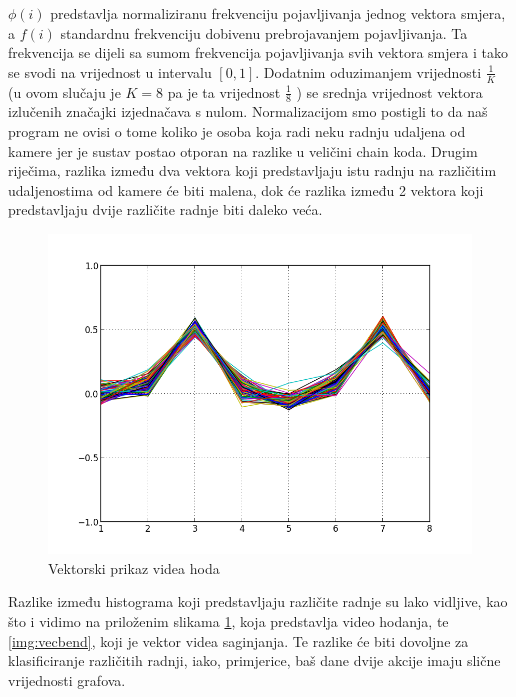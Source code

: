 \documentclass[times, utf8, diplomski]{fer}
\begin{document}
$\phi(i)$ predstavlja normaliziranu frekvenciju pojavljivanja jednog vektora smjera, a $f(i)$ standardnu frekvenciju dobivenu prebrojavanjem pojavljivanja.
Ta frekvencija se dijeli sa sumom frekvencija pojavljivanja svih vektora smjera i tako se svodi na vrijednost u intervalu $[0, 1]$. Dodatnim oduzimanjem vrijednosti $ \frac{1}{K}$ (u ovom slučaju je $K=8$ pa je ta vrijednost $\frac{1}{8}$ ) se srednja vrijednost vektora izlučenih značajki izjednačava s nulom.
Normalizacijom smo postigli to da naš program ne ovisi o tome koliko je osoba koja radi neku radnju udaljena od kamere jer je sustav postao otporan
na razlike u veličini chain koda. Drugim riječima, razlika između dva vektora koji predstavljaju istu radnju na različitim udaljenostima od kamere će biti malena, dok će razlika između 2 vektora koji predstavljaju dvije različite radnje biti daleko veća.

\begin{figure}[ht]
\centering
\includegraphics[scale=0.7]{vecwalk.png}
\caption{Vektorski prikaz videa hoda}
\label{img:vecwalk}
\end{figure}

Razlike između histograma koji predstavljaju različite radnje su lako vidljive, kao što i vidimo na priloženim slikama \ref{img:vecwalk}, koja predstavlja video hodanja, te \ref{img:vecbend}, koji je vektor videa saginjanja. Te razlike će biti dovoljne za klasificiranje različitih radnji, iako, primjerice, baš dane dvije akcije imaju slične vrijednosti grafova.
\end{document}
